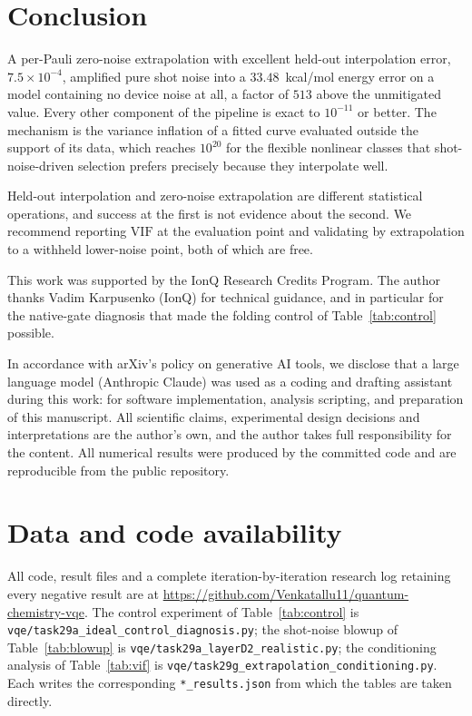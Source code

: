 \documentclass[aps,prx,twocolumn,superscriptaddress,nofootinbib,floatfix]{revtex4-2}
\begin{document}
\section{Conclusion}

A per-Pauli zero-noise extrapolation with excellent held-out
interpolation error, $7.5\times10^{-4}$, amplified pure shot noise into a
$33.48$~kcal/mol energy error on a model containing no device noise at
all, a factor of $513$ above the unmitigated value. Every other component
of the pipeline is exact to $10^{-11}$ or better. The mechanism is the
variance inflation of a fitted curve evaluated outside the support of its
data, which reaches $10^{20}$ for the flexible nonlinear classes that
shot-noise-driven selection prefers precisely because they interpolate
well.

Held-out interpolation and zero-noise extrapolation are different
statistical operations, and success at the first is not evidence about the
second. We recommend reporting $\mathrm{VIF}$ at the evaluation point and
validating by extrapolation to a withheld lower-noise point, both of which
are free.

\begin{acknowledgments}
This work was supported by the IonQ Research Credits Program. The author
thanks Vadim Karpusenko (IonQ) for technical guidance, and in particular
for the native-gate diagnosis that made the folding control of
Table~\ref{tab:control} possible.

In accordance with arXiv's policy on generative AI tools, we disclose that
a large language model (Anthropic Claude) was used as a coding and
drafting assistant during this work: for software implementation,
analysis scripting, and preparation of this manuscript. All scientific
claims, experimental design decisions and interpretations are the author's
own, and the author takes full responsibility for the content. All
numerical results were produced by the committed code and are
reproducible from the public repository.
\end{acknowledgments}

\section*{Data and code availability}

All code, result files and a complete iteration-by-iteration research log
retaining every negative result are at
\url{https://github.com/Venkatallu11/quantum-chemistry-vqe}. The control
experiment of Table~\ref{tab:control} is
\texttt{vqe/task29a\_ideal\_control\_diagnosis.py}; the shot-noise blowup
of Table~\ref{tab:blowup} is
\texttt{vqe/task29a\_layerD2\_realistic.py}; the conditioning analysis of
Table~\ref{tab:vif} is
\texttt{vqe/task29g\_extrapolation\_conditioning.py}. Each writes the
corresponding \texttt{*\_results.json} from which the tables are taken
directly.
\end{document}

